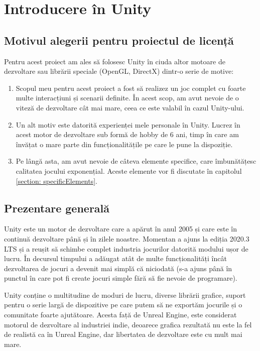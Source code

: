 \documentclass[12pt, a4paper]{article}
\begin{document}
	
	\section{Introducere în Unity}
	
	\subsection{Motivul alegerii pentru proiectul de licență}
	
	Pentru acest proiect am ales să folosesc Unity în ciuda altor motoare de dezvoltare sau librării speciale (OpenGL, DirectX) dintr-o serie de motive:
	
	\begin{enumerate}
		\item Scopul meu pentru acest proiect a fost să realizez un joc complet cu foarte multe interacțiuni și scenarii definite. În acest scop, am avut nevoie de o viteză de dezvoltare cât mai mare, ceea ce este valabil în cazul Unity-ului.
		\item Un alt motiv este datorită experienței mele personale în Unity. Lucrez în acest motor de dezvoltare sub formă de hobby de 6 ani, timp în care am învățat o mare parte din funcționalitățile pe care le pune la dispoziție.
		\item Pe lângă asta, am avut nevoie de câteva elemente specifice, care \newline îmbunătățesc calitatea jocului exponențial. Aceste elemente vor fi discutate în capitolul \hyperref[section: specificElements]{\ref{section: specificElements}}.
	\end{enumerate}
	
	
	
	
	
	\subsection{Prezentare generală}
	
	Unity este un motor de dezvoltare care a apărut în anul 2005 și care este în continuă dezvoltare până și în zilele noastre. Momentan a ajuns la ediția 2020.3 LTS și a reușit să schimbe complet industria jocurilor datorită modului ușor de lucru. În decursul timpului a adăugat atât de multe funcționalități încât dezvoltarea de jocuri a devenit mai simplă că niciodată (s-a ajuns până în punctul în care pot fi create jocuri simple fără să fie nevoie de programare).
	\newline
	
	Unity conține o multitudine de moduri de lucru, diverse librării grafice, suport pentru o serie largă de dispozitive pe care putem să ne exportăm jocurile și o comunitate foarte ajutătoare. Acesta față de Unreal Engine, este considerat motorul de dezvoltare al industriei indie, deoarece grafica rezultată nu este la fel de realistă ca în Unreal Engine, dar libertatea de dezvoltare este cu mult mai mare.
	\newline
	
\end{document}
